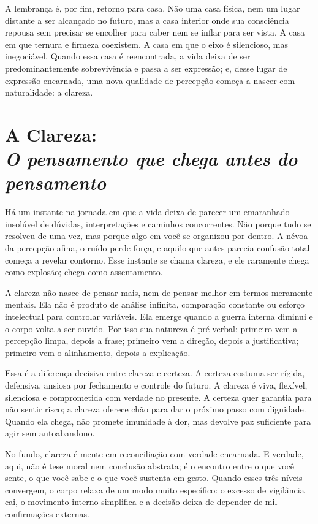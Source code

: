 \documentclass[12pt]{book}
\begin{document}
A lembrança é, por fim, retorno para casa. Não uma casa física, nem um lugar distante a ser alcançado no futuro, mas a casa interior onde sua consciência repousa sem precisar se encolher para caber nem se inflar para ser vista. A casa em que ternura e firmeza coexistem. A casa em que o eixo é silencioso, mas inegociável. Quando essa casa é reencontrada, a vida deixa de ser predominantemente sobrevivência e passa a ser expressão; e, desse lugar de expressão encarnada, uma nova qualidade de percepção começa a nascer com naturalidade: a clareza.

\chapter[A Clareza: O pensamento que chega antes do pensamento]{A Clareza:\\[0.4ex]\large\itshape O pensamento que chega antes do pensamento}

Há um instante na jornada em que a vida deixa de parecer um emaranhado insolúvel de dúvidas, interpretações e caminhos concorrentes. Não porque tudo se resolveu de uma vez, mas porque algo em você se organizou por dentro. A névoa da percepção afina, o ruído perde força, e aquilo que antes parecia confusão total começa a revelar contorno. Esse instante se chama clareza, e ele raramente chega como explosão; chega como assentamento.

A clareza não nasce de pensar mais, nem de pensar melhor em termos meramente mentais. Ela não é produto de análise infinita, comparação constante ou esforço intelectual para controlar variáveis. Ela emerge quando a guerra interna diminui e o corpo volta a ser ouvido. Por isso sua natureza é pré-verbal: primeiro vem a percepção limpa, depois a frase; primeiro vem a direção, depois a justificativa; primeiro vem o alinhamento, depois a explicação.

Essa é a diferença decisiva entre clareza e certeza. A certeza costuma ser rígida, defensiva, ansiosa por fechamento e controle do futuro. A clareza é viva, flexível, silenciosa e comprometida com verdade no presente. A certeza quer garantia para não sentir risco; a clareza oferece chão para dar o próximo passo com dignidade. Quando ela chega, não promete imunidade à dor, mas devolve paz suficiente para agir sem autoabandono.

No fundo, clareza é mente em reconciliação com verdade encarnada. E verdade, aqui, não é tese moral nem conclusão abstrata; é o encontro entre o que você sente, o que você sabe e o que você sustenta em gesto. Quando esses três níveis convergem, o corpo relaxa de um modo muito específico: o excesso de vigilância cai, o movimento interno simplifica e a decisão deixa de depender de mil confirmações externas.
\end{document}

